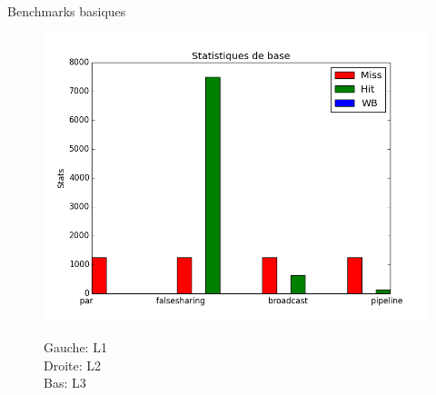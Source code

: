 \begin{frame}{Benchmarks basiques}
\begin{figure}[t!]
  \begin{minipage}[l]{.46\textwidth}
    \includegraphics[scale=0.22]{images/stats_L3.png}
  \end{minipage} \hfill
   \begin{minipage}[r]{.46\textwidth}
     Gauche: L1 \\
     Droite: L2 \\
     Bas: L3
   \end{minipage}
\end{figure}
\end{frame}

